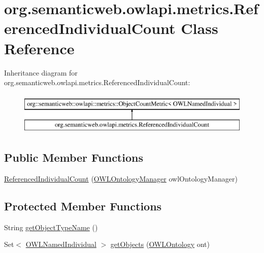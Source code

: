 \hypertarget{classorg_1_1semanticweb_1_1owlapi_1_1metrics_1_1_referenced_individual_count}{\section{org.\-semanticweb.\-owlapi.\-metrics.\-Referenced\-Individual\-Count Class Reference}
\label{classorg_1_1semanticweb_1_1owlapi_1_1metrics_1_1_referenced_individual_count}
}
Inheritance diagram for org.\-semanticweb.\-owlapi.\-metrics.\-Referenced\-Individual\-Count\-:\begin{figure}[H]
\begin{center}
\leavevmode
\includegraphics[height=2.000000cm]{classorg_1_1semanticweb_1_1owlapi_1_1metrics_1_1_referenced_individual_count}
\end{center}
\end{figure}
\subsection*{Public Member Functions}
\begin{DoxyCompactItemize}
\item 
\hyperlink{classorg_1_1semanticweb_1_1owlapi_1_1metrics_1_1_referenced_individual_count_a4719d5a3f3a0cf888af48b729dccee51}{Referenced\-Individual\-Count} (\hyperlink{interfaceorg_1_1semanticweb_1_1owlapi_1_1model_1_1_o_w_l_ontology_manager}{O\-W\-L\-Ontology\-Manager} owl\-Ontology\-Manager)
\end{DoxyCompactItemize}
\subsection*{Protected Member Functions}
\begin{DoxyCompactItemize}
\item 
String \hyperlink{classorg_1_1semanticweb_1_1owlapi_1_1metrics_1_1_referenced_individual_count_a350a06299f6a931799191e9f539692fc}{get\-Object\-Type\-Name} ()
\item 
Set$<$ \hyperlink{interfaceorg_1_1semanticweb_1_1owlapi_1_1model_1_1_o_w_l_named_individual}{O\-W\-L\-Named\-Individual} $>$ \hyperlink{classorg_1_1semanticweb_1_1owlapi_1_1metrics_1_1_referenced_individual_count_a44eee4f1924b21bae86efa8f7b5f6366}{get\-Objects} (\hyperlink{interfaceorg_1_1semanticweb_1_1owlapi_1_1model_1_1_o_w_l_ontology}{O\-W\-L\-Ontology} ont)
\end{DoxyCompactItemize}


